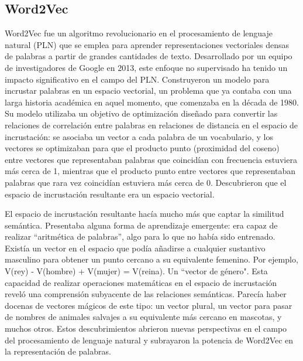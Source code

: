 \subsection{Word2Vec}

Word2Vec fue un algoritmo revolucionario en el procesamiento de lenguaje natural (PLN) que se emplea para aprender representaciones vectoriales densas de palabras a partir de grandes cantidades de texto. Desarrollado por un equipo de investigadores de Google en 2013\cite{Mikolov2013Word2Vec}, este enfoque no supervisado ha tenido un impacto significativo en el campo del PLN. Construyeron un modelo para incrustar palabras en un espacio vectorial, un problema que ya contaba con una larga historia académica en aquel momento, que comenzaba en la década de 1980. Su modelo utilizaba un objetivo de optimización diseñado para convertir las relaciones de correlación entre palabras en relaciones de distancia en el espacio de incrustación: se asociaba un vector a cada palabra de un vocabulario, y los vectores se optimizaban para que el producto punto (proximidad del coseno) entre vectores que representaban palabras que coincidían con frecuencia estuviera más cerca de 1, mientras que el producto punto entre vectores que representaban palabras que rara vez coincidían estuviera más cerca de 0. Descubrieron que el espacio de incrustación resultante era un espacio vectorial. 

El espacio de incrustación resultante hacía mucho más que captar la similitud semántica. Presentaba alguna forma de aprendizaje emergente: era capaz de realizar ``aritmética de palabras'', algo para lo que no había sido entrenado. Existía un vector en el espacio que podía añadirse a cualquier sustantivo masculino para obtener un punto cercano a su equivalente femenino. Por ejemplo, V(rey) - V(hombre) + V(mujer) = V(reina). Un ``vector de género". Esta capacidad de realizar operaciones matemáticas en el espacio de incrustación reveló una comprensión subyacente de las relaciones semánticas. Parecía haber docenas de vectores mágicos de este tipo: un vector plural, un vector para pasar de nombres de animales salvajes a su equivalente más cercano en mascotas, y muchos otros. Estos descubrimientos abrieron nuevas perspectivas en el campo del procesamiento de lenguaje natural y subrayaron la potencia de Word2Vec en la representación de palabras.



